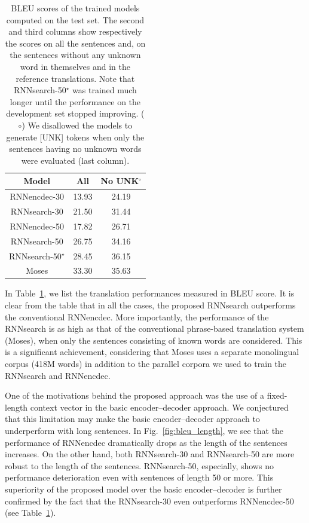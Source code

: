 \documentclass{article} %
\begin{document}
\begin{table}[t]
    \centering
    \hfill
    \begin{minipage}{0.45\textwidth}
        \begin{tabular}{c|c|c}
        Model & All & No UNK$^\circ$ \\
        \hline
        \hline
        RNNencdec-30 & 13.93 & 24.19 \\
        RNNsearch-30 & 21.50 & 31.44 \\
        \hline
        RNNencdec-50 & 17.82 & 26.71 \\
        RNNsearch-50 & 26.75 & 34.16 \\
        \hline
        RNNsearch-50$^\star$ & 28.45 & 36.15 \\
        \hline
        Moses & 33.30 & 35.63
        \end{tabular}
    \end{minipage}
    \begin{minipage}[t!]{0.53\textwidth}
        \vspace{-2mm}

        \caption{BLEU scores of the trained models computed on the test set.
            The second and third columns show respectively the scores on all the
            sentences and, on the sentences without any unknown word in
            themselves and in the reference translations. Note that
            RNNsearch-50$^\star$ was trained much longer until the performance
            on the development set stopped improving.  ($\circ$) We disallowed
            the models to generate [UNK] tokens when only the sentences having
            no unknown words were evaluated (last column).  
        }
        \label{tab:bleu}
    \end{minipage}
    \hfill
\end{table}

In Table~\ref{tab:bleu}, we list the translation performances measured in BLEU
score. It is clear from the table that in all the cases, the proposed RNNsearch
outperforms the conventional RNNencdec.  More importantly, the performance of the
RNNsearch is as high as that of the conventional phrase-based translation system
(Moses), when only the sentences consisting of known words are considered. This
is a significant achievement, considering that Moses uses a separate monolingual
corpus (418M words) in addition to the parallel corpora we used to train the
RNNsearch and RNNencdec.

One of the motivations behind the proposed approach was the use of a
fixed-length context vector in the basic encoder--decoder approach. We
conjectured that this limitation may make the basic encoder--decoder approach to
underperform with long sentences. In Fig.~\ref{fig:bleu_length}, we see that the
performance of RNNencdec dramatically drops as the length of the sentences
increases. On the other hand, both RNNsearch-30 and RNNsearch-50 are more robust
to the length of the sentences. RNNsearch-50, especially, shows no performance
deterioration even with sentences of length 50 or more. This superiority of the
proposed model over the basic encoder--decoder is further confirmed by the fact
that the RNNsearch-30 even outperforms RNNencdec-50 (see Table~\ref{tab:bleu}).
\end{document}
